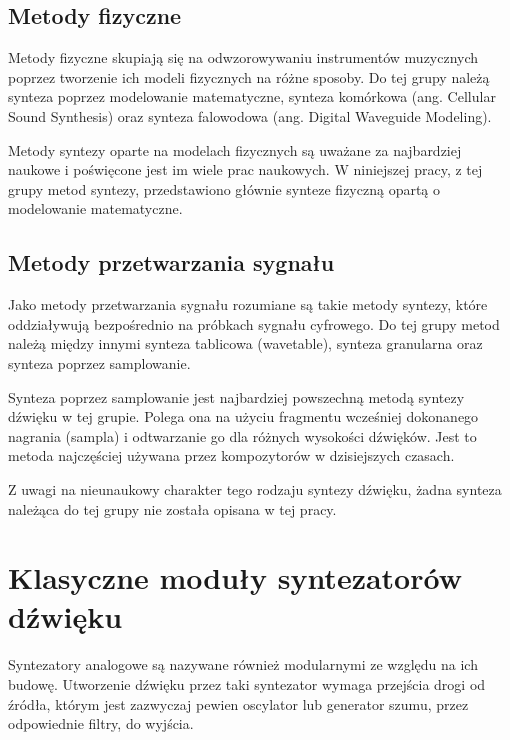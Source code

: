\subsection{Metody fizyczne}
Metody fizyczne skupiają się na odwzorowywaniu instrumentów muzycznych poprzez tworzenie ich modeli fizycznych na różne sposoby. Do tej grupy należą synteza poprzez modelowanie matematyczne, synteza komórkowa (ang. Cellular Sound Synthesis) oraz synteza falowodowa (ang. Digital Waveguide Modeling).

Metody syntezy oparte na modelach fizycznych są uważane za najbardziej naukowe i poświęcone jest im wiele prac naukowych. W niniejszej pracy, z tej grupy metod syntezy, przedstawiono głównie synteze fizyczną opartą o modelowanie matematyczne.

\subsection{Metody przetwarzania sygnału}
Jako metody przetwarzania sygnału rozumiane są takie metody syntezy, które oddziaływują bezpośrednio na próbkach sygnału cyfrowego. Do tej grupy metod należą między innymi synteza tablicowa (wavetable), synteza granularna oraz synteza poprzez samplowanie.

Synteza poprzez samplowanie jest najbardziej powszechną metodą syntezy dźwięku w tej grupie. Polega ona na użyciu fragmentu wcześniej dokonanego nagrania (sampla) i odtwarzanie go dla różnych wysokości dźwięków. Jest to metoda najczęściej używana przez kompozytorów w dzisiejszych czasach.

Z uwagi na nieunaukowy charakter tego rodzaju syntezy dźwięku, żadna synteza należąca do tej grupy nie została opisana w tej pracy.



\section{Klasyczne moduły syntezatorów dźwięku}
Syntezatory analogowe są nazywane również modularnymi ze względu na ich budowę. Utworzenie dźwięku przez taki syntezator wymaga przejścia drogi od źródła, którym jest zazwyczaj pewien oscylator lub generator szumu, przez odpowiednie filtry, do wyjścia.

